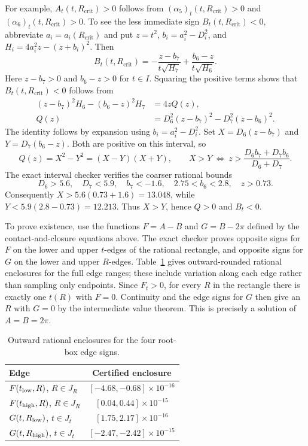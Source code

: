 \documentclass[11pt,a4paper]{article}
\theoremstyle{remark}
\newcommand{\Rcrit}{R_{\mathrm{crit}}}
\begin{document}
For example, $A_t(t,\Rcrit)>0$ follows from
$(\alpha_5)_t(t,\Rcrit)>0$ and $(\alpha_6)_t(t,\Rcrit)>0$.  To see the
less immediate sign $B_t(t,\Rcrit)<0$, abbreviate $a_i=a_i(\Rcrit)$ and put
$z=t^2$, $b_i=a_i^2-D_i^2$, and $H_i=4a_i^2z-(z+b_i)^2$.  Then
\[
 B_t(t,\Rcrit)=-\frac{z-b_7}{t\sqrt{H_7}}
       +\frac{b_6-z}{t\sqrt{H_6}}.
\]
Here $z-b_7>0$ and $b_6-z>0$ for $t\in I$.  Squaring the positive terms
shows that $B_t(t,\Rcrit)<0$ follows from
\begin{align*}
 (z-b_7)^2H_6-(b_6-z)^2H_7&=4zQ(z),\\
 Q(z)&=D_6^2(z-b_7)^2-D_7^2(z-b_6)^2.
\end{align*}
The identity follows by expansion using $b_i=a_i^2-D_i^2$.  Set
$X=D_6(z-b_7)$ and $Y=D_7(b_6-z)$.  Both are positive on this interval, so
\[
 Q(z)=X^2-Y^2=(X-Y)(X+Y),\qquad
 X>Y\ \Longleftrightarrow\
 z>\frac{D_6b_7+D_7b_6}{D_6+D_7}.
\]
The exact interval checker verifies the coarser rational bounds
\[
 D_6>5.6,\quad D_7<5.9,\quad b_7<-1.6,\quad
 2.75<b_6<2.8,\quad z>0.73.
\]
Consequently $X>5.6(0.73+1.6)=13.048$, while
$Y<5.9(2.8-0.73)=12.213$.  Thus $X>Y$, hence $Q>0$ and $B_t<0$.

To prove existence, use the functions $F=A-B$ and $G=B-2\pi$ defined by
the contact-and-closure equations above.
The exact checker proves opposite signs for $F$ on the lower and upper
$t$-edges of the rational rectangle, and opposite signs for $G$ on the lower
and upper $R$-edges.  Table~\ref{tab:root-edge-signs} gives outward-rounded
rational enclosures for the full edge ranges; these include variation along
each edge rather than sampling only endpoints.  Since $F_t>0$,
for every $R$ in the rectangle there is exactly one $t(R)$ with $F=0$.
Continuity and the edge signs for $G$ then give an $R$ with $G=0$ by the
intermediate value theorem.  This is precisely a solution of
$A=B=2\pi$.

\begin{table}[ht]
\centering
\small
\caption{Outward rational enclosures for the four root-box edge signs.}
\label{tab:root-edge-signs}
\begin{tabular}{lc}
\toprule
Edge & Certified enclosure\\
\midrule
$F(t_{\rm low},R)$, $R\in J_R$ & $[-4.68,-0.68]\times10^{-16}$\\
$F(t_{\rm high},R)$, $R\in J_R$ & $[0.04,0.44]\times10^{-15}$\\
$G(t,R_{\rm low})$, $t\in J_t$ & $[1.75,2.17]\times10^{-16}$\\
$G(t,R_{\rm high})$, $t\in J_t$ & $[-2.47,-2.42]\times10^{-15}$\\
\bottomrule
\end{tabular}
\end{table}
\end{document}
